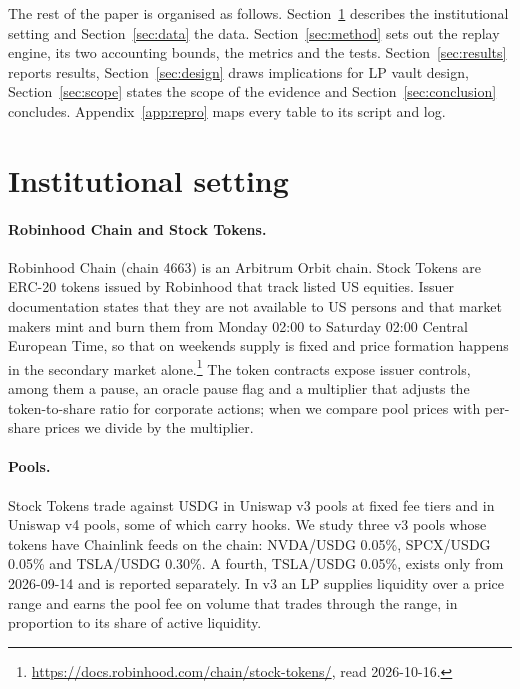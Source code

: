 \documentclass[11pt]{article}
\begin{document}
The rest of the paper is organised as follows. Section~\ref{sec:setting} describes the institutional setting and Section~\ref{sec:data} the data. Section~\ref{sec:method} sets out the replay engine, its two accounting bounds, the metrics and the tests. Section~\ref{sec:results} reports results, Section~\ref{sec:design} draws implications for LP vault design, Section~\ref{sec:scope} states the scope of the evidence and Section~\ref{sec:conclusion} concludes. Appendix~\ref{app:repro} maps every table to its script and log.

\section{Institutional setting}\label{sec:setting}

\paragraph{Robinhood Chain and Stock Tokens.} Robinhood Chain (chain 4663) is an Arbitrum Orbit chain. Stock Tokens are ERC-20 tokens issued by Robinhood that track listed US equities. Issuer documentation states that they are not available to US persons and that market makers mint and burn them from Monday 02:00 to Saturday 02:00 Central European Time, so that on weekends supply is fixed and price formation happens in the secondary market alone.\footnote{\url{https://docs.robinhood.com/chain/stock-tokens/}, read 2026-10-16.} The token contracts expose issuer controls, among them a pause, an oracle pause flag and a multiplier that adjusts the token-to-share ratio for corporate actions; when we compare pool prices with per-share prices we divide by the multiplier.

\paragraph{Pools.} Stock Tokens trade against USDG in Uniswap v3 pools at fixed fee tiers and in Uniswap v4 pools, some of which carry hooks. We study three v3 pools whose tokens have Chainlink feeds on the chain: NVDA/USDG 0.05\%, SPCX/USDG 0.05\% and TSLA/USDG 0.30\%. A fourth, TSLA/USDG 0.05\%, exists only from 2026-09-14 and is reported separately. In v3 an LP supplies liquidity over a price range and earns the pool fee on volume that trades through the range, in proportion to its share of active liquidity.
\end{document}
